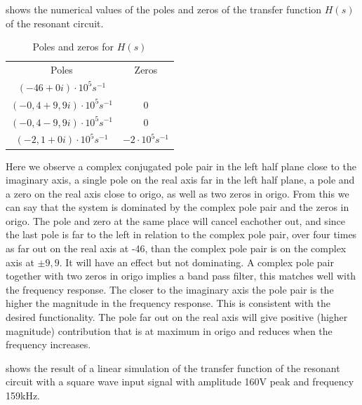  shows the numerical values of the poles and zeros of the transfer function $H(s)$ of the resonant circuit.

\begin{table}[H]
    \centering
    \begin{tabular}{c|c}
        Poles & Zeros \\
        $(-46 + 0i)   \cdot 10^{5} s^{-1}$ & \\
        $(-0,4 + 9,9i)\cdot 10^{5} s^{-1}$ & $0$ \\
        $(-0,4 - 9,9i)\cdot 10^{5} s^{-1}$ & $0$ \\
        $(-2,1 + 0i)  \cdot 10^{5} s^{-1}$ & $-2\cdot 10^{5} s^{-1}$ \\
    \end{tabular}
    \caption{Poles and zeros for $H(s)$}
    \label{tab:coilrigpoles}
\end{table}

Here we observe a complex conjugated pole pair in the left half plane close to the imaginary axis, a single pole on the real axis far in the left half plane, a pole and a zero on the real axis close to origo, as well as two zeros in origo. From this we can say that the system is dominated by the complex pole pair and the zeros in origo. The pole and zero at the same place will cancel eachother out, and since the last pole is far to the left in relation to the complex pole pair, over four times as far out on the real axis at -46, than the complex pole pair is on the complex axis at $\pm 9,9$. It will have an effect but not dominating. A complex pole pair together with two zeros in origo implies a band pass filter, this matches well with the frequency response. The closer to the imaginary axis the pole pair is the higher the magnitude in the frequency response. This is consistent with the desired functionality. The pole far out on the real axis will give positive (higher magnitude) contribution that is at maximum in origo and reduces when the frequency increases.

 shows the result of a linear simulation of the transfer function of the resonant circuit with a square wave input signal with amplitude 160V peak and frequency 159kHz.

